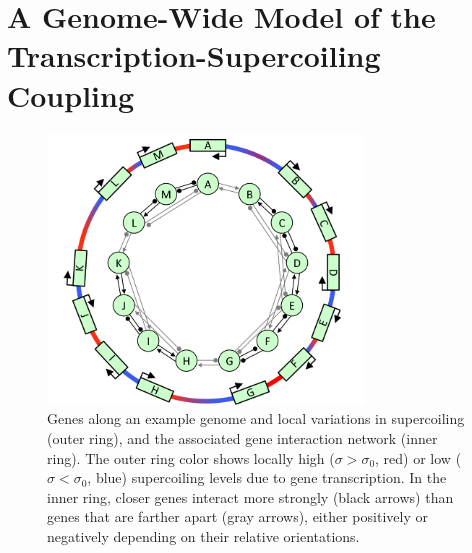 
\section{A Genome-Wide Model of the Transcription-Supercoiling Coupling}
\label{sec:alife:indiv_model}

\begin{figure}[H]
  \centering
  \includegraphics[width=0.75\textwidth]{alife/img/reseau.png}
  \caption[Hand-drawn genome and local interactions resulting from the TSC]{Genes along an example genome and local variations in supercoiling (outer ring), and the associated gene interaction network (inner ring).
  The outer ring color shows locally high ($\sigma > \sigma_0$, red) or low ($\sigma < \sigma_0$, blue) supercoiling levels due to gene transcription.
  In the inner ring, closer genes interact more strongly (black arrows) than genes that are farther apart (gray arrows), either positively or negatively depending on their relative orientations.}
  \label{fig:alife:network}
\end{figure}


